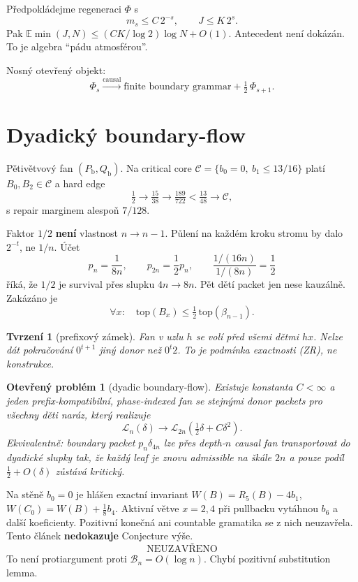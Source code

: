\documentclass[11pt,a4paper]{article}
\newtheorem{proposition}[theorem]{Tvrzení}
\theoremstyle{definition}
\theoremstyle{remark}
\theoremstyle{plain}
\newtheorem{conjecture}[theorem]{Otevřený problém}
\newcommand{\E}{\mathbb E}
\begin{document}
Předpokládejme regeneraci $\Phi$ s
\[
m_s\le C\,2^{-s},\qquad J\le K\,2^s.
\tag{F,G}
\]
Pak $\E\min(J,N)\le (CK/\log 2)\log N+O(1)$. Antecedent není dokázán.
To je algebra ``pádu atmosférou''.

Nosný otevřený objekt:
\[
\Phi_s\stackrel{\mathrm{causal}}{\longrightarrow}
\text{finite boundary grammar}+\tfrac12\,\Phi_{s+1}.
\]

\section{Dyadický boundary-flow}

Pětivětvový fan $(P_{\mathrm b},Q_{\mathrm b})$. Na critical core
$\mathcal C=\{b_0=0,\ b_1\le 13/16\}$ platí $B_0,B_2\in\mathcal C$ a hard edge
\[
\tfrac12\to\tfrac{15}{38}\to\tfrac{189}{722}
<\tfrac{13}{48}\to\mathcal C,
\]
s repair marginem alespoň $7/128$.

Faktor $1/2$ \textbf{není} vlastnost $n\to n-1$. Půlení na každém kroku
stromu by dalo $2^{-t}$, ne $1/n$. Účet
\[
p_n=\frac1{8n},\qquad p_{2n}=\frac12 p_n,
\qquad
\frac{1/(16n)}{1/(8n)}=\frac12
\]
říká, že $1/2$ je survival přes slupku $4n\to 8n$. Pět dětí packet jen nese
kauzálně. Zakázáno je
\[
\forall x:\quad \mathrm{top}(B_x)\le\tfrac12\,\mathrm{top}(\beta_{n-1}).
\]

\begin{proposition}[prefixový zámek]
Fan v uzlu $h$ se volí před všemi dětmi $hx$. Nelze dát pokračování
$0^{t+1}$ jiný donor než $0^t2$. To je podmínka exactnosti (ZR), ne
konstrukce.
\end{proposition}

\begin{conjecture}[dyadic boundary-flow]
Existuje konstanta $C<\infty$ a jeden prefix-kompatibilní, phase-indexed
fan se stejnými donor packets pro všechny děti naráz, který realizuje
\[
\mathcal L_n(\delta)\longrightarrow
\mathcal L_{2n}\!\left(\tfrac12\delta+C\delta^2\right).
\]
Ekvivalentně: boundary packet $p_n\delta_{4n}$ lze přes depth-$n$ causal
fan transportovat do dyadické slupky tak, že každý leaf je znovu
admissible na škále $2n$ a pouze podíl $\frac12+O(\delta)$ zůstává
kritický.
\end{conjecture}

Na stěně $b_0=0$ je hlášen exactní invariant
$W(B)=R_5(B)-4b_1$, $W(C_0)=W(B)+\frac18 b_4$. Aktivní větve $x=2,4$ při
pullbacku vytáhnou $b_6$ a další koeficienty. Pozitivní konečná ani
countable gramatika se z nich neuzavřela. Tento článek \textbf{nedokazuje}
Conjecture výše.
\[
\boxed{\text{NEUZAVŘENO}}
\]
To není protiargument proti $\mathcal B_n=O(\log n)$. Chybí pozitivní
substitution lemma.
\end{document}
